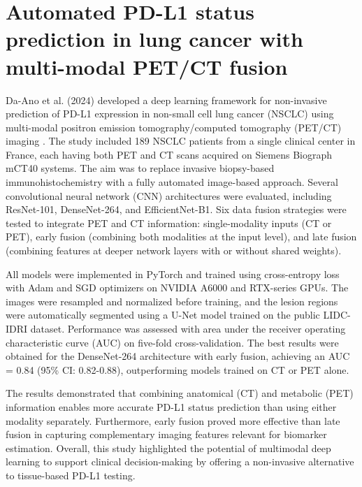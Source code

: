 \section{Automated PD-L1 status prediction in lung cancer with multi-modal PET/CT fusion}
Da-Ano et al. (2024) developed a deep learning framework for non-invasive prediction of PD-L1 expression in non-small cell lung cancer (NSCLC) using multi-modal positron emission tomography/computed tomography (PET/CT) imaging \cite{Da-Ano2024-oo}. The study included 189 NSCLC patients from a single clinical center in France, each having both PET and CT scans acquired on Siemens Biograph mCT40 systems. The aim was to replace invasive biopsy-based immunohistochemistry with a fully automated image-based approach. Several convolutional neural network (CNN) architectures were evaluated, including ResNet-101, DenseNet-264, and EfficientNet-B1. Six data fusion strategies were tested to integrate PET and CT information: single-modality inputs (CT or PET), early fusion (combining both modalities at the input level), and late fusion (combining features at deeper network layers with or without shared weights).

All models were implemented in PyTorch and trained using cross-entropy loss with Adam and SGD optimizers on NVIDIA A6000 and RTX-series GPUs. The images were resampled and normalized before training, and the lesion regions were automatically segmented using a U-Net model trained on the public LIDC-IDRI dataset. Performance was assessed with area under the receiver operating characteristic curve (AUC) on five-fold cross-validation. The best results were obtained for the DenseNet-264 architecture with early fusion, achieving an AUC = 0.84 (95\% CI: 0.82-0.88), outperforming models trained on CT or PET alone.

The results demonstrated that combining anatomical (CT) and metabolic (PET) information enables more accurate PD-L1 status prediction than using either modality separately. Furthermore, early fusion proved more effective than late fusion in capturing complementary imaging features relevant for biomarker estimation. Overall, this study highlighted the potential of multimodal deep learning to support clinical decision-making by offering a non-invasive alternative to tissue-based PD-L1 testing.
